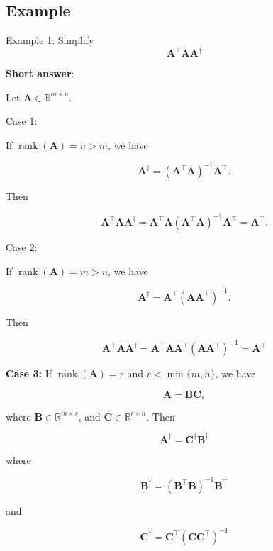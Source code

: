 \subsection{Example}
Example 1: Simplify
\[
	\boldsymbol{A}^{\top} \boldsymbol{A} \boldsymbol{A}^{\dagger}
\]


\textbf{Short answer}:

Let \(\boldsymbol{A} \in \mathbb{R}^{m \times n}\).

Case 1:

If \(\operatorname{rank}(\boldsymbol{A})=n>m\), we have

\[
	\boldsymbol{A}^{\dagger}=\left(\boldsymbol{A}^{\top} \boldsymbol{A}\right)^{-1} \boldsymbol{A}^{\top} .
\]

Then

\[
	\boldsymbol{A}^{\top} \boldsymbol{A} \boldsymbol{A}^{\dagger}=\boldsymbol{A}^{\top} \boldsymbol{A}\left(\boldsymbol{A}^{\top} \boldsymbol{A}\right)^{-1} \boldsymbol{A}^{\top}=\boldsymbol{A}^{\top} .
\]

Case 2:

If \(\operatorname{rank}(\boldsymbol{A})=m>n\), we have

\[
	\boldsymbol{A}^{\dagger}=\boldsymbol{A}^{\top}\left(\boldsymbol{A} \boldsymbol{A}^{\top}\right)^{-1} .
\]

Then

\[
	\boldsymbol{A}^{\top} \boldsymbol{A} \boldsymbol{A}^{\dagger}=\boldsymbol{A}^{\top} \boldsymbol{A} \boldsymbol{A}^{\top}\left(\boldsymbol{A} \boldsymbol{A}^{\top}\right)^{-1}=\boldsymbol{A}^{\top}
\]

\textbf{Case 3:}
If \(\operatorname{rank}(\boldsymbol{A})=r\) and \(r<\min \{m, n\}\), we have

\[
	\boldsymbol{A}=\boldsymbol{B} \boldsymbol{C},
\]

where \(\boldsymbol{B} \in \mathbb{R}^{m \times r}\), and \(\boldsymbol{C} \in \mathbb{R}^{r \times n}\). Then

\[
	\boldsymbol{A}^{\dagger}=\boldsymbol{C}^{\dagger} \boldsymbol{B}^{\dagger}
\]

where

\[
	\boldsymbol{B}^{\dagger}=\left(\boldsymbol{B}^{\top} \boldsymbol{B}\right)^{-1} \boldsymbol{B}^{\top}
\]

and

\[
	\boldsymbol{C}^{\dagger}=\boldsymbol{C}^{\top}\left(\boldsymbol{C} \boldsymbol{C}^{\top}\right)^{-1}
\]

